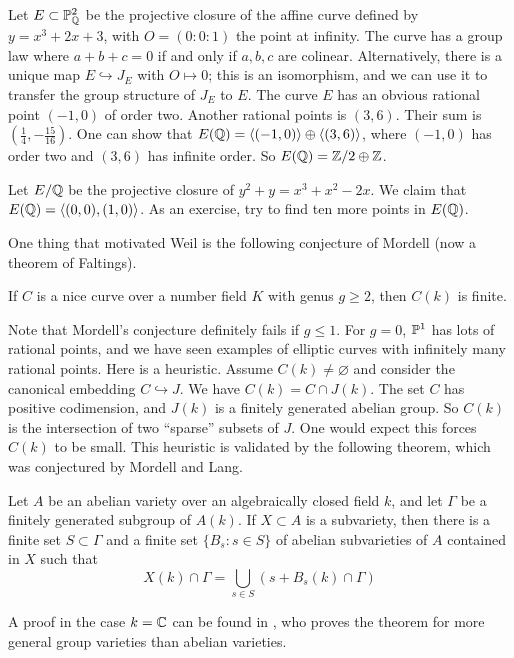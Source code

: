 \documentclass{article}
\begin{document}
\begin{example}
Let $E\subset \mathbb{P}_{\mathbb{Q}}^2$ be the projective closure of the affine curve 
defined by $y=x^3+2 x+3$, with $O=(0:0:1)$ the point at infinity. The curve 
has a group law where $a+b+c=0$ if and only if $a,b,c$ are colinear. 
Alternatively, there is a unique map $E\hookrightarrow J_E$ with $O\mapsto 0$; 
this is an isomorphism, and we can use it to transfer the group structure of 
$J_E$ to $E$. The curve $E$ has an obvious rational point $(-1,0)$ of order 
two. Another rational points is $(3,6)$. Their sum is 
$\left(\frac 1 4,-\frac{15}{16}\right)$. One can show that 
$E(\mathbb{Q}) = \langle (-1,0)\rangle \oplus \langle (3,6)\rangle$, where 
$(-1,0)$ has order two and $(3,6)$ has infinite order. So 
$E(\mathbb{Q}) = \mathbb{Z}/2\oplus \mathbb{Z}$. 
\end{example}

\begin{example}
Let $E/\mathbb{Q}$ be the projective closure of $y^2+y = x^3+x^2 - 2 x$. We claim 
that $E(\mathbb{Q}) = \langle (0,0),(1,0)\rangle$. As an exercise, try to find ten 
more points in $E(\mathbb{Q})$. 
\end{example}

One thing that motivated Weil is the following conjecture of Mordell (now a 
theorem of Faltings). 

\begin{theorem}[Faltings]
If $C$ is a nice curve over a number field $K$ with genus $g\geqslant 2$, then 
$C(k)$ is finite.
\end{theorem}

Note that Mordell's conjecture definitely fails if $g\leqslant 1$. For $g=0$, 
$\mathbb{P}^1$ has lots of rational points, and we have seen examples of 
elliptic curves with infinitely many rational points. Here is a heuristic. 
Assume $C(k)\ne\varnothing$ and consider the canonical embedding 
$C\hookrightarrow J$. We have $C(k)=C\cap J(k)$. The set $C$ has positive 
codimension, and $J(k)$ is a finitely generated abelian group. So 
$C(k)$ is the intersection of two ``sparse'' subsets of $J$. One would expect 
this forces $C(k)$ to be small. This heuristic is validated by the following 
theorem, which was conjectured by Mordell and Lang.

\begin{theorem}[Faltings]
Let $A$ be an abelian variety over an algebraically closed field $k$, and let 
$\Gamma$ be a finitely generated subgroup of $A(k)$. If $X\subset A$ is a 
subvariety, then there is a finite set $S\subset \Gamma$ and a finite set 
$\{B_s:s\in S\}$ of abelian subvarieties of $A$ contained in $X$ such that 
\[
  X(k)\cap \Gamma = \bigcup_{s\in S} \left(s+ B_s(k)\cap \Gamma\right)
\]
\end{theorem}
A proof in the case $k=\mathbb{C}$ can be found in \cite{mc95}, who proves the theorem 
for more general group varieties than abelian varieties. 
\end{document}
